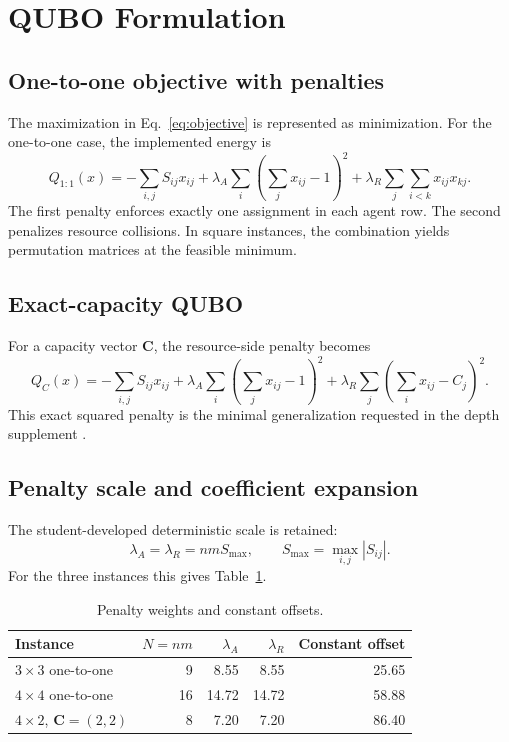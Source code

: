 \section{QUBO Formulation}

\subsection{One-to-one objective with penalties}

The maximization in Eq.~\eqref{eq:objective} is represented as minimization. For the one-to-one case, the implemented energy is
\begin{equation}
Q_{1:1}(x)=
-\sum_{i,j}S_{ij}x_{ij}
+\lambda_A\sum_i\left(\sum_jx_{ij}-1\right)^2
+\lambda_R\sum_j\sum_{i<k}x_{ij}x_{kj}.
\label{eq:qubo_one_to_one}
\end{equation}
The first penalty enforces exactly one assignment in each agent row. The second penalizes resource collisions. In square instances, the combination yields permutation matrices at the feasible minimum.

\subsection{Exact-capacity QUBO}

For a capacity vector $\bm C$, the resource-side penalty becomes
\begin{equation}
Q_C(x)=
-\sum_{i,j}S_{ij}x_{ij}
+\lambda_A\sum_i\left(\sum_jx_{ij}-1\right)^2
+\lambda_R\sum_j\left(\sum_ix_{ij}-C_j\right)^2.
\label{eq:qubo_capacity}
\end{equation}
This exact squared penalty is the minimal generalization requested in the depth supplement \cite{depthsupplement}.

\subsection{Penalty scale and coefficient expansion}

The student-developed deterministic scale is retained:
\begin{equation}
\lambda_A=\lambda_R=nmS_{\max},
\qquad
S_{\max}=\max_{i,j}|S_{ij}|.
\label{eq:penalty_scale}
\end{equation}
For the three instances this gives Table~\ref{tab:penalties}.

\begin{table}[H]
\centering
\caption{Penalty weights and constant offsets.}
\label{tab:penalties}
\begin{tabular}{lrrrr}
\toprule
Instance & $N=nm$ & $\lambda_A$ & $\lambda_R$ & Constant offset\\
\midrule
$3\times3$ one-to-one & 9 & 8.55 & 8.55 & 25.65\\
$4\times4$ one-to-one & 16 & 14.72 & 14.72 & 58.88\\
$4\times2$, $\bm C=(2,2)$ & 8 & 7.20 & 7.20 & 86.40\\
\bottomrule
\end{tabular}
\end{table}

